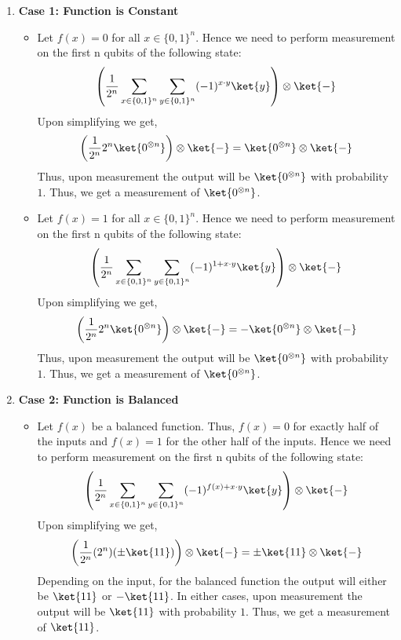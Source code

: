 \documentclass[12pt, oneside]{book}
\theoremstyle{definition}
\theoremstyle{definition}
\theoremstyle{remark}
\begin{document}
\begin{enumerate}
    \item \textbf{Case 1: Function is Constant}
    \begin{itemize}
        \item Let $f(x)=0$ for all $x \in \{0,1\}^n$. Hence we need to perform measurement on the first n qubits of the following state:
        \[
            \left(\frac{1}{2^n}\sum_{x \in \{0,1\}^n}\sum_{y \in \{0,1\}^n}(-1)^{x\cdot y}\ket{y}\right)\otimes \ket{-}
        \]
        Upon simplifying we get,
        \[
            \left(\frac{1}{2^n}2^n\ket{0^{\otimes n}}\right)\otimes \ket{-} = \ket{0^{\otimes n}} \otimes \ket{-}
        \]
        Thus, upon measurement the output will be $\ket{0^{\otimes n}}$ with probability $1$. Thus, we get a measurement of $\ket{0^{\otimes n}}$.
        \item Let $f(x)=1$ for all $x \in \{0,1\}^n$. Hence we need to perform measurement on the first n qubits of the following state:
        \[
            \left(\frac{1}{2^n}\sum_{x \in \{0,1\}^n}\sum_{y \in \{0,1\}^n}(-1)^{1+x\cdot y}\ket{y}\right)\otimes \ket{-}
        \]
        Upon simplifying we get,
        \[
            \left(\frac{1}{2^n}2^n\ket{0^{\otimes n}}\right)\otimes \ket{-} = -\ket{0^{\otimes n}} \otimes \ket{-}
        \]
        Thus, upon measurement the output will be $\ket{0^{\otimes n}}$ with probability $1$. Thus, we get a measurement of $\ket{0^{\otimes n}}$.
    \end{itemize}
    \item \textbf{Case 2: Function is Balanced}
    \begin{itemize}
        \item Let $f(x)$ be a balanced function. Thus, $f(x)=0$ for exactly half of the inputs and $f(x)=1$ for the other half of the inputs. Hence we need to perform measurement on the first n qubits of the following state:
        \[
            \left(\frac{1}{2^n}\sum_{x \in \{0,1\}^n}\sum_{y \in \{0,1\}^n}(-1)^{f(x)+x\cdot y}\ket{y}\right)\otimes \ket{-}
        \]
        Upon simplifying we get,
        \[
            \left(\frac{1}{2^n}(2^n)(\pm\ket{11})\right)\otimes \ket{-}=\pm \ket{11}\otimes \ket{-}
        \]
        Depending on the input, for the balanced function the output will either be $\ket{11}$ or $-\ket{11}$.
        In either cases, upon measurement the output will be $\ket{11}$ with probability $1$. Thus, we get a measurement of $\ket{11}$.
    \end{itemize}
\end{enumerate}
\end{document}
